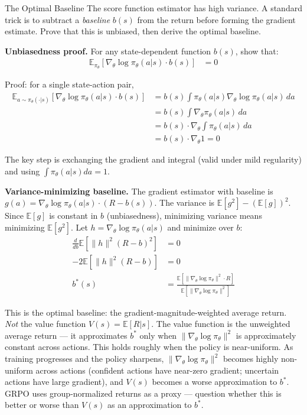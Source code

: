 \begin{thinkfirst}{The Optimal Baseline}
The score function estimator has high variance. A standard trick is to subtract a \textit{baseline} $b(s)$ from the return before forming the gradient estimate. Prove that this is unbiased, then derive the optimal baseline.

\textbf{Unbiasedness proof.} For any state-dependent function $b(s)$, show that:
\begin{align*}
  \mathbb{E}_{\pi_\theta}\!\left[\nabla_\theta \log \pi_\theta(a|s) \cdot b(s)\right] &= 0
\end{align*}

Proof: for a single state-action pair,
\begin{align*}
  \mathbb{E}_{a \sim \pi_\theta(\cdot|s)}\!\left[\nabla_\theta \log \pi_\theta(a|s) \cdot b(s)\right]
  &= b(s) \int \pi_\theta(a|s) \nabla_\theta \log \pi_\theta(a|s) \, da \\
  &= b(s) \int \nabla_\theta \pi_\theta(a|s) \, da \\
  &= b(s) \cdot \nabla_\theta \int \pi_\theta(a|s) \, da \\
  &= b(s) \cdot \nabla_\theta 1 = 0
\end{align*}

The key step is exchanging the gradient and integral (valid under mild regularity) and using $\int \pi_\theta(a|s) da = 1$.

\textbf{Variance-minimizing baseline.} The gradient estimator with baseline is $g(a) = \nabla_\theta \log \pi_\theta(a|s) \cdot (R - b(s))$. The variance is $\mathbb{E}[g^2] - (\mathbb{E}[g])^2$. Since $\mathbb{E}[g]$ is constant in $b$ (unbiasedness), minimizing variance means minimizing $\mathbb{E}[g^2]$. Let $h = \nabla_\theta \log \pi_\theta(a|s)$ and minimize over $b$:
\begin{align*}
  \frac{d}{db} \mathbb{E}\!\left[\|h\|^2 (R - b)^2\right] &= 0 \\
  -2 \mathbb{E}\!\left[\|h\|^2 (R - b)\right] &= 0 \\
  b^*(s) &= \frac{\mathbb{E}\!\left[\|\nabla_\theta \log \pi_\theta\|^2 \cdot R\right]}{\mathbb{E}\!\left[\|\nabla_\theta \log \pi_\theta\|^2\right]}
\end{align*}

This is the optimal baseline: the gradient-magnitude-weighted average return. \textit{Not} the value function $V(s) = \mathbb{E}[R | s]$. The value function is the unweighted average return --- it approximates $b^*$ only when $\|\nabla_\theta \log \pi_\theta\|^2$ is approximately constant across actions. This holds roughly when the policy is near-uniform. As training progresses and the policy sharpens, $\|\nabla_\theta \log \pi_\theta\|^2$ becomes highly non-uniform across actions (confident actions have near-zero gradient; uncertain actions have large gradient), and $V(s)$ becomes a worse approximation to $b^*$. GRPO uses group-normalized returns as a proxy --- question whether this is better or worse than $V(s)$ as an approximation to $b^*$.
\end{thinkfirst}

